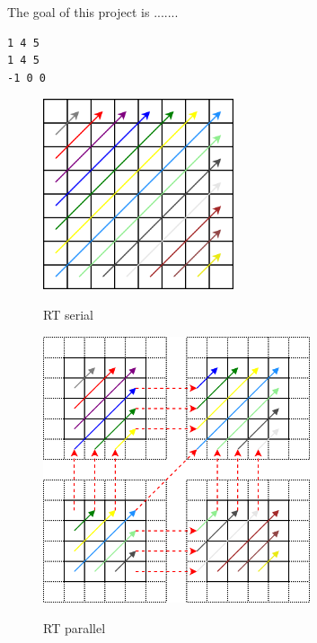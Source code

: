 The goal of this project is .......

\begin{verbatim}
1 4 5
1 4 5
-1 0 0
\end{verbatim}

\begin{figure}[!htbp]
  \centering
  \includegraphics[width=0.5\textwidth]{graphics/projects/rt-ser.png}
  \label{fig:rt-ser}
  \caption{RT serial}
\end{figure}

\begin{figure}[!htbp]
  \centering
  \includegraphics[width=0.7\textwidth]{graphics/projects/rt-par.png}
  \label{fig:rt-par}
  \caption{RT parallel}
\end{figure}

